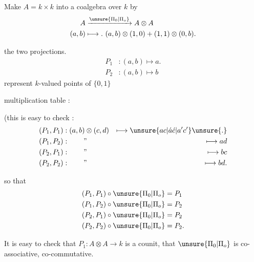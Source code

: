Make $A=k\times k$ into a coalgebra over $k$ by
\[
\begin{aligned}
 A&\xrightarrow{\unsure{\Pi_0|\Pi_o}}A\otimes A\\
 (a,b)&\longmapsto.\ (a,b)\otimes(1,0)+(1,1)\otimes(0,b).
\end{aligned}
\]

the two projections.
\[
\begin{aligned}
P_1 &: (a,b)\longmapsto a.\\
P_2 &: (a,b)\longmapsto b
\end{aligned}
\]
represent $k$-valued points of $\{0,1\}$

multiplication table :

(this is easy to check :
\[
\begin{aligned}
(P_1,P_1)&:(a,b)\otimes(c,d)&\longmapsto\unsure{ac|\acute a\acute c|a'c'}\unsure{.}\\
(P_1,P_2)&:\qquad\text{\rq\rq}&\longmapsto ad\\
(P_2,P_1)&:\qquad\text{\rq\rq}&\longmapsto bc\\
(P_2,P_2)&:\qquad\text{\rq\rq}&\longmapsto bd.
\end{aligned}
\]
\clearpage


so that
\[
\begin{aligned}
(P_1,P_1)\circ\unsure{\Pi_0|\Pi_o}&=P_1\\
(P_1,P_2)\circ\unsure{\Pi_0|\Pi_o}&=P_2\\
(P_2,P_1)\circ\unsure{\Pi_0|\Pi_o}&=P_2\\
(P_2,P_2)\circ\unsure{\Pi_0|\Pi_o}&=P_2.
\end{aligned}
\]

It is easy to check that $P_1:A\otimes A\longrightarrow k$ is a counit, that $\unsure{\Pi_0|\Pi_o}$ is co-associative, co-commutative.

